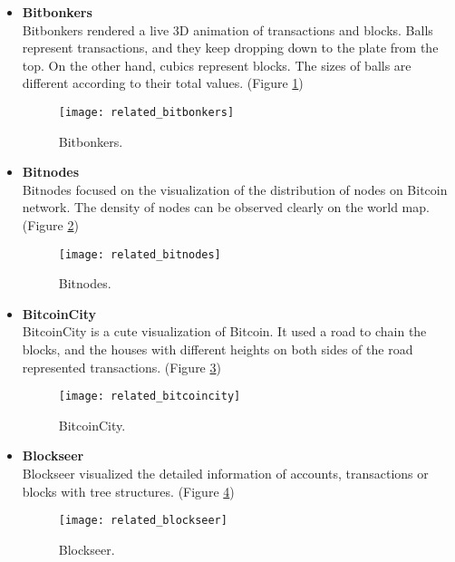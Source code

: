 \begin{itemize}
    \item \textbf{Bitbonkers} \cite{bitbonkers} \\
        Bitbonkers rendered a live 3D animation of transactions and blocks. Balls represent transactions, and they keep dropping down to the plate from the top. On the other hand, cubics represent blocks. The sizes of balls are different according to their total values. (Figure \ref{fig:bitbonkers})
        \begin{figure}[htb]
            \centering
            \texttt{[image: related\_bitbonkers]}
            \caption{Bitbonkers.}
            \label{fig:bitbonkers}
        \end{figure}
    \item \textbf{Bitnodes} \cite{bitnodes} \\
        Bitnodes focused on the visualization of the distribution of nodes on Bitcoin network. The density of nodes can be observed clearly on the world map. (Figure \ref{fig:bitnodes})
        \begin{figure}[htb]
            \centering
            \texttt{[image: related\_bitnodes]}
            \caption{Bitnodes.}
            \label{fig:bitnodes}
        \end{figure}
    \clearpage
    \vspace*{\fill}
    \item \textbf{BitcoinCity} \cite{bitcoincity} \\
        BitcoinCity is a cute visualization of Bitcoin. It used a road to chain the blocks, and the houses with different heights on both sides of the road represented transactions. (Figure \ref{fig:bitcoincity})
        \begin{figure}[htb]
            \centering
            \texttt{[image: related\_bitcoincity]}
            \caption{BitcoinCity.}
            \label{fig:bitcoincity}
        \end{figure}
    \item \textbf{Blockseer} \cite{blockseer} \\
        Blockseer visualized the detailed information of accounts, transactions or blocks with tree structures. (Figure \ref{fig:blockseer})
        \begin{figure}[htb]
            \centering
            \texttt{[image: related\_blockseer]}
            \caption{Blockseer.}
            \label{fig:blockseer}
        \end{figure}

\end{itemize}
